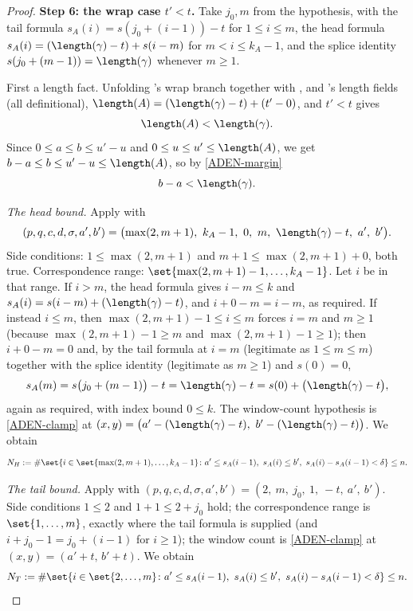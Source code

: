 \begin{proof}
  \textbf{Step 6: the wrap case $t'<t$.} Take $j_0,m$ from the hypothesis, with the tail formula
  $s_A(i)=s(j_0+(i-1))-t$ for $1\le i\le m$, the head formula
  $s_A(i)=(\length(\gamma)-t)+s(i-m)$ for $m<i\le k_A-1$, and the splice identity
  $s(j_0+(m-1))=\length(\gamma)$ whenever $m\ge1$.

  First a length fact. Unfolding 's wrap branch together with
  ,  and 's length fields
  (all definitional), $\length(A)=(\length(\gamma)-t)+(t'-0)$, and $t'<t$ gives
  \begin{equation}\label{ADEN-margin}
    \length(A) < \length(\gamma)
    .
  \end{equation}
  Since $0\le a\le b\le u'-u$ and $0\le u\le u'\le\length(A)$, we get
  $b-a\le b\le u'-u\le\length(A)$, so by \eqref{ADEN-margin}
  \begin{equation}\label{ADEN-gapsmall}
    b-a < \length(\gamma)
    .
  \end{equation}

  \emph{The head bound.} Apply  with
  \[
    (p,q,c,d,\sigma,a',b') = \bigl(\max(2,m+1),\ k_A-1,\ 0,\ m,\ \length(\gamma)-t,\ a',\ b'\bigr).
  \]
  Side conditions: $1\le\max(2,m+1)$ and $m+1\le\max(2,m+1)+0$, both true. Correspondence range:
  $\set{\max(2,m+1)-1,\dots,k_A-1}$. Let $i$ be in that range. If $i>m$, the head formula gives
  $i-m\le k$ and $s_A(i)=s(i-m)+(\length(\gamma)-t)$, and $i+0-m=i-m$, as required. If instead
  $i\le m$, then $\max(2,m+1)-1\le i\le m$ forces $i=m$ and $m\ge1$ (because
  $\max(2,m+1)-1\ge m$ and $\max(2,m+1)-1\ge1$); then $i+0-m=0$ and, by the tail formula at $i=m$
  (legitimate as $1\le m\le m$) together with the splice identity (legitimate as $m\ge1$) and
  $s(0)=0$,
  \[
    s_A(m) = s\bigl(j_0+(m-1)\bigr)-t = \length(\gamma)-t = s(0)+\bigl(\length(\gamma)-t\bigr),
  \]
  again as required, with index bound $0\le k$. The window-count hypothesis is \eqref{ADEN-clamp}
  at $(x,y)=\bigl(a'-(\length(\gamma)-t),\ b'-(\length(\gamma)-t)\bigr)$. We obtain
  \begin{equation}\label{ADEN-head}
    N_H := \#\set{ i\in\set{\max(2,m+1),\dots,k_A-1} \colon a'\le s_A(i-1),\ s_A(i)\le b',\
      s_A(i)-s_A(i-1)<\delta } \le n .
  \end{equation}

  \emph{The tail bound.} Apply  with
  $(p,q,c,d,\sigma,a',b')=(2,\ m,\ j_0,\ 1,\ -t,\ a',\ b')$. Side conditions $1\le2$ and
  $1+1\le2+j_0$ hold; the correspondence range is $\set{1,\dots,m}$, exactly where the tail
  formula is supplied (and $i+j_0-1=j_0+(i-1)$ for $i\ge1$); the window count is
  \eqref{ADEN-clamp} at $(x,y)=(a'+t,\,b'+t)$. We obtain
  \begin{equation}\label{ADEN-tail}
    N_T := \#\set{ i\in\set{2,\dots,m} \colon a'\le s_A(i-1),\ s_A(i)\le b',\
      s_A(i)-s_A(i-1)<\delta } \le n .
  \end{equation}


\end{proof}
